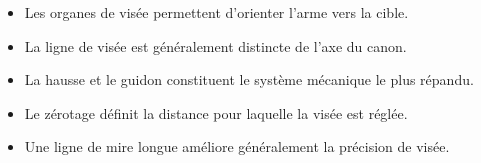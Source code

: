 \begin{aretenir}

\begin{itemize}
    \item Les organes de visée permettent d'orienter l'arme vers la cible.
    \item La ligne de visée est généralement distincte de l'axe du canon.
    \item La hausse et le guidon constituent le système mécanique le plus
    répandu.
    \item Le zérotage définit la distance pour laquelle la visée est réglée.
    \item Une ligne de mire longue améliore généralement la précision de
    visée.
\end{itemize}

\end{aretenir}
